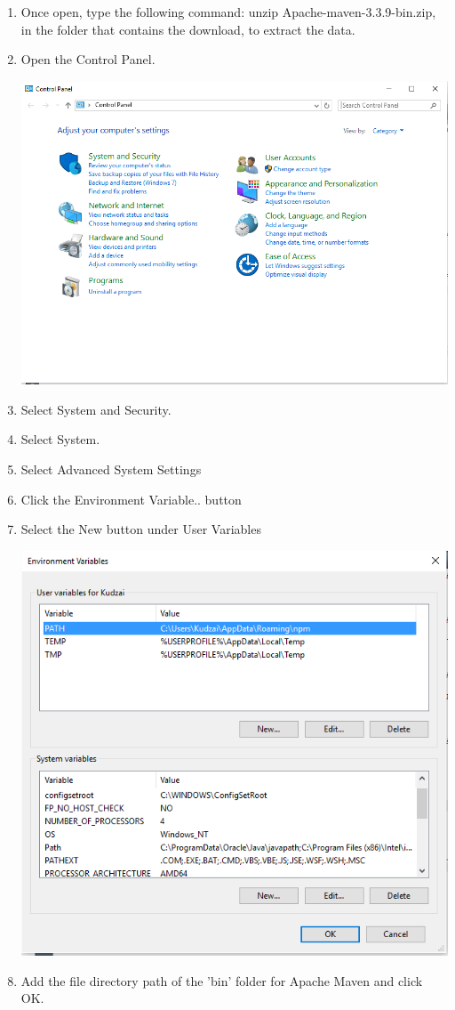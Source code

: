 \documentclass[a4paper,12pt]{article}
\begin{document}
\begin{enumerate}
\item Once open, type the following command: unzip Apache-maven-3.3.9-bin.zip, in the folder that contains the download, to extract the data.
\item Open the Control Panel.

\includegraphics[width=0.9\linewidth, center]{./Installation/maven_download_4.PNG}\\[0.4cm]

\newpage
\item Select System and Security.
\item Select System.
\item Select Advanced System Settings
\item Click the Environment Variable.. button
\item Select the New button under User Variables

\includegraphics[width=0.9\linewidth, center]{./Installation/maven_download_5.PNG}\\[0.4cm]

\item Add the file directory path of the 'bin' folder for Apache Maven and click OK.
\end{enumerate}
\end{document}
